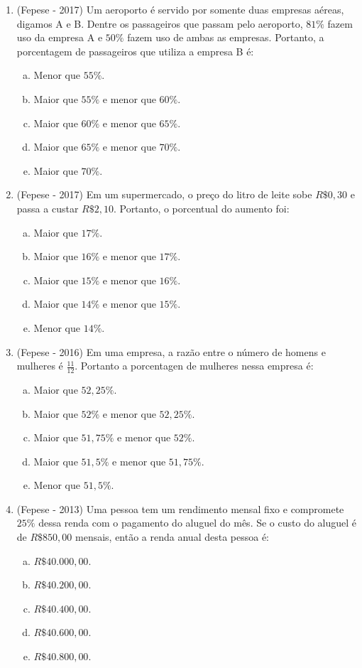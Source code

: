 \begin{enumerate}
   \item (Fepese - 2017) Um aeroporto é servido por somente duas empresas aéreas, digamos A e B. Dentre os passageiros que passam pelo aeroporto, $81\%$ fazem uso da empresa A e $50\%$ fazem uso de ambas as empresas. Portanto, a porcentagem de passageiros que utiliza a empresa B é:

  \begin{enumerate}[a)]
   \item Menor que $55\%$.
   \item Maior que $55\%$ e menor que $60\%$.
   \item Maior que $60\%$ e menor que $65\%$.
   \item Maior que $65\%$ e menor que $70\%$.
   \item Maior que $70\%$.
   \end{enumerate}

   \item (Fepese - 2017) Em um supermercado, o preço do litro de leite sobe $R\$ 0,30$ e passa a custar $R\$ 2,10$. Portanto, o porcentual do aumento foi:
    \begin{enumerate}[a)]
    \item Maior que $17\%$.
    \item Maior que $16\%$ e menor que $17\%$.
    \item Maior que $15\%$ e menor que $16\%$.
    \item Maior que $14\%$ e menor que $15\%$.
    \item Menor que $14\%$.
    \end{enumerate}

    \item (Fepese - 2016) Em uma empresa, a razão entre o número de homens e mulheres é $\frac{11}{12}$. Portanto a porcentagen de mulheres nessa empresa é:
    \begin{enumerate}[a)]
    \item Maior que $52,25\%$.
    \item Maior que $52\%$ e menor que $52,25\%$.
    \item Maior que $51,75\%$ e menor que $52\%$.
    \item Maior que $51,5\%$ e menor que $51,75\%$.
    \item Menor que $51,5\%$.
    \end{enumerate}

    \item (Fepese - 2013) Uma pessoa tem um rendimento mensal fixo e compromete $25\%$ dessa renda com o pagamento do aluguel do mês. Se o custo do aluguel é de $R\$850,00$ mensais, então a renda anual desta pessoa é:
    \begin{enumerate}[a)]
    \item $R\$ 40.000,00$.
    \item $R\$ 40.200,00$.
    \item $R\$ 40.400,00$.
    \item $R\$ 40.600,00$.
    \item $R\$ 40.800,00$.
    \end{enumerate}


\end{enumerate}
